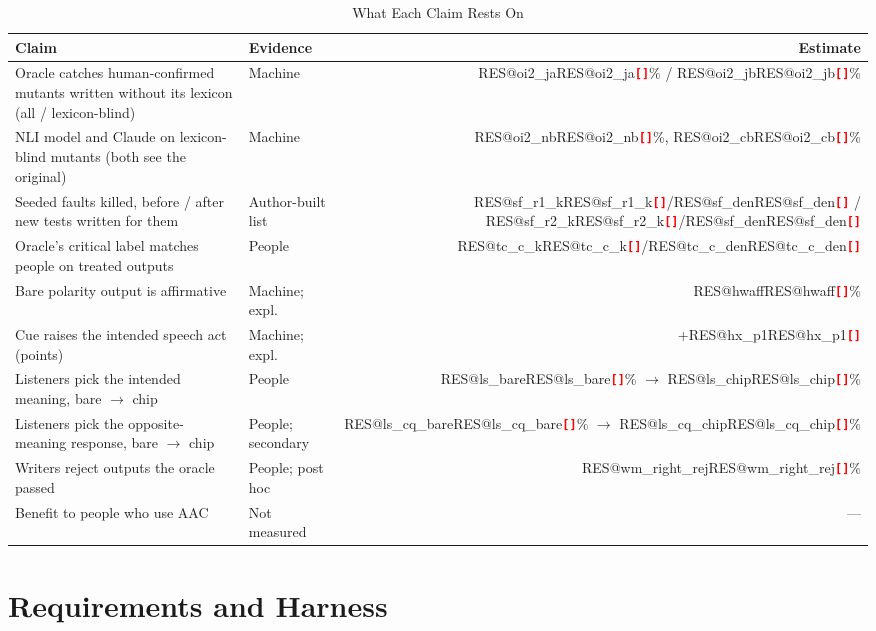 \documentclass[conference,10pt]{IEEEtran}
\makeatletter
\newcommand{\RES}[1]{\ifcsname RES@#1\endcsname\csname RES@#1\endcsname\else\RESmissing{#1}\fi}
\newcommand{\RESmissing}[1]{\textcolor{red}{\textbf{\texttt{[\detokenize{#1}]}}}}
\newcommand{\pct}[1]{\RES{#1}\%}
\newcommand{\kof}[1]{\RES{#1_k}/\RES{#1_den}}
\makeatother
\begin{document}
\begin{table}[t]
  \caption{What Each Claim Rests On}
  \label{tab:status}
  \centering\footnotesize
  \setlength{\tabcolsep}{3pt}
  \begin{tabularx}{\columnwidth}{@{}>{\raggedright\arraybackslash}X>{\raggedright\arraybackslash}p{1.95cm}r@{}}
    \toprule
    Claim & Evidence & Estimate\\
    \midrule
    Oracle catches human-confirmed mutants written without its lexicon (all / lexicon-blind) & Machine & \pct{oi2_ja} / \pct{oi2_jb}\\
    NLI model and Claude on lexicon-blind mutants (both see the original) & Machine & \pct{oi2_nb}, \pct{oi2_cb}\\
    Seeded faults killed, before / after new tests written for them & Author-built list & \RES{sf_r1_k}/\RES{sf_den} / \RES{sf_r2_k}/\RES{sf_den}\\
    Oracle's critical label matches people on treated outputs & People & \kof{tc_c}\\
    Bare polarity output is affirmative & Machine; expl. & \pct{hwaff}\\
    Cue raises the intended speech act (points) & Machine; expl. & +\RES{hx_p1}\\
    Listeners pick the intended meaning, bare $\to$ chip & People & \pct{ls_bare} $\to$ \pct{ls_chip}\\
    Listeners pick the opposite-meaning response, bare $\to$ chip & People; secondary & \pct{ls_cq_bare} $\to$ \pct{ls_cq_chip}\\
    Writers reject outputs the oracle passed & People; post hoc & \pct{wm_right_rej}\\
    Benefit to people who use AAC & Not measured & ---\\
    \bottomrule
  \end{tabularx}
  \par{}
\end{table}

\section{Requirements and Harness}
\label{sec:harness}
\end{document}
